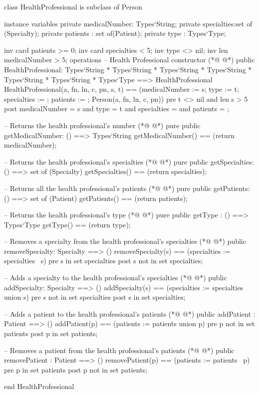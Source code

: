 \begin{vdmpp}[breaklines=true]
class HealthProfessional is subclass of Person

instance variables
  private medicalNumber: Types`String;
  private specialties:set of (Specialty);
  private patients : set of(Patient);
 private type : Types`Type;
 
 inv card patients >= 0;
  inv card specialties < 5;
 inv type <> nil;
 inv len medicalNumber > 5;
operations
 -- Health Professional constructor
(*@
\label{HealthProfessional:15}
@*)
 public HealthProfessional: Types`String * Types`String * Types`String * Types`String * Types`String * Types`String * Types`Type ==> HealthProfessional
  HealthProfessional(a, fn, ln, c, pn, s, t) == (medicalNumber := s; type := t; specialties := {}; patients := {}; Person(a, fn, ln, c, pn))
 pre t <> nil and len s > 5
 post medicalNumber = s and type = t and specialties = {} and patients = {};
 
 -- Returns the health professional's number
(*@
\label{getMedicalNumber:21}
@*)
 pure public getMedicalNumber: () ==> Types`String
  getMedicalNumber() == (return medicalNumber);
 
 -- Returns the health professional's specialties
(*@
\label{getSpecialties:25}
@*)
 pure public getSpecialties: () ==> set of (Specialty)
  getSpecialties() == (return specialties);
 
 -- Returns all the health professional's patients
(*@
\label{getPatients:29}
@*)
 pure public getPatients: () ==> set of (Patient)
  getPatients() == (return patients);
 
 -- Returns the health professional's type
(*@
\label{getType:33}
@*)
 pure public getType : () ==> Types`Type
  getType() == (return type);
 
 -- Removes a specialty from the health professional's specialties
(*@
\label{removeSpecialty:37}
@*)
 public removeSpecialty: Specialty ==> ()
  removeSpecialty(s) == (specialties := specialties \ {s})
 pre s in set specialties
 post s not in set specialties;
 
 -- Adds a specialty to the health professional's specialties
(*@
\label{addSpecialty:43}
@*)
 public addSpecialty: Specialty ==> ()
  addSpecialty(s) == (specialties := specialties union {s})
 pre s not in set specialties
 post s in set specialties;
 
 -- Adds a patient to the health professional's patients
(*@
\label{addPatient:49}
@*)
 public addPatient : Patient ==> ()
  addPatient(p) == (patients :=  patients union {p})
 pre p not in set patients
 post p in set patients;
 
 -- Removes a patient from the health professional's patients
(*@
\label{removePatient:55}
@*)
 public removePatient : Patient ==> ()
  removePatient(p) == (patients := patients \ {p})
 pre p in set patients
 post p not in set patients;

end HealthProfessional
\end{vdmpp}
